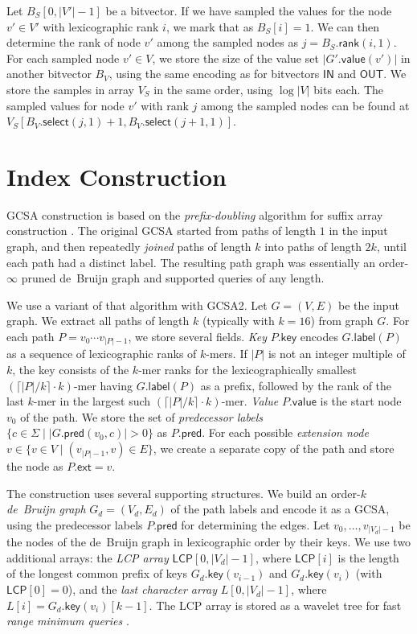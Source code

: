 \documentclass[twoside,leqno,twocolumn]{article}
\newcommand{\set}[1]{\ensuremath{\{ #1 \}}}
\newcommand{\abs}[1]{\ensuremath{\lvert #1 \rvert}}
\newcommand{\rank}{\ensuremath{\mathsf{rank}}}
\newcommand{\select}{\ensuremath{\mathsf{select}}}
\newcommand{\glabel}{\ensuremath{\mathsf{label}}}
\newcommand{\gpred}{\ensuremath{\mathsf{pred}}}
\newcommand{\gkey}{\ensuremath{\mathsf{key}}}
\newcommand{\gvalue}{\ensuremath{\mathsf{value}}}
\newcommand{\gext}{\ensuremath{\mathsf{ext}}}
\newcommand{\kmer}[1]{$#1$\nobreakdash-mer}
\newcommand{\orderk}[1]{order\nobreakdash-$#1$}
\newcommand{\LCP}{\ensuremath{\mathsf{LCP}}}
\newcommand{\bvIN}{\ensuremath{\mathsf{IN}}}
\newcommand{\bvOUT}{\ensuremath{\mathsf{OUT}}}
\begin{document}
Let $B_{S}[0, \abs{V'}-1]$ be a bitvector. If we have sampled the values for the node $v' \in V'$ with lexicographic rank $i$, we mark that as $B_{S}[i] = 1$. We can then determine the rank of node $v'$ among the sampled nodes as $j = B_{S}.\rank(i, 1)$. For each sampled node $v' \in V$, we store the size of the value set $\abs{G'.\gvalue(v')}$ in another bitvector $B_{V}$, using the same encoding as for bitvectors $\bvIN$ and $\bvOUT$. We store the samples in array $V_{S}$ in the same order, using $\log \abs{V}$ bits each. The sampled values for node $v'$ with rank $j$ among the sampled nodes can be found at $V_{S}[B_{V}.\select(j, 1) + 1, B_{V}.\select(j+1, 1)]$.


\section{Index Construction}\label{appendix:construction}

GCSA construction \cite{Siren2014} is based on the \emph{prefix-doubling} algorithm for suffix array construction \cite{Manber1993}. The original GCSA started from paths of length $1$ in the input graph, and then repeatedly \emph{joined} paths of length $k$ into paths of length $2k$, until each path had a distinct label. The resulting path graph was essentially an \orderk{\infty} pruned de~Bruijn graph and supported queries of any length.

We use a variant of that algorithm with GCSA2. Let $G = (V, E)$ be the input graph. We extract all paths of length $k$ (typically with $k = 16$) from graph $G$. For each path $P = v_{0} \dotsm v_{\abs{P}-1}$, we store several fields. \emph{Key} $P.\gkey$ encodes $G.\glabel(P)$ as a sequence of lexicographic ranks of \kmer{k}s. If $\abs{P}$ is not an integer multiple of $k$, the key consists of the \kmer{k} ranks for the lexicographically smallest \kmer{(\lceil \abs{P}/k \rceil \cdot k)} having $G.\glabel(P)$ as a prefix, followed by the rank of the last \kmer{k} in the largest such \kmer{(\lceil \abs{P}/k \rceil \cdot k)}. \emph{Value} $P.\gvalue$ is the start node $v_{0}$ of the path. We store the set of \emph{predecessor labels} $\set{c \in \Sigma \mid \abs{G.\gpred(v_{0}, c)} > 0}$ as $P.\gpred$. For each possible \emph{extension node} $v \in \set{v \in V \mid (v_{\abs{P}-1}, v) \in E}$, we create a separate copy of the path and store the node as $P.\gext = v$.

The construction uses several supporting structures. We build an \orderk{k} \emph{de~Bruijn graph} $G_{d} = (V_{d}, E_{d})$ of the path labels and encode it as a GCSA, using the predecessor labels $P.\gpred$ for determining the edges. Let $v_{0}, \dotsc, v_{\abs{V_{d}}-1}$ be the nodes of the de~Bruijn graph in lexicographic order by their keys. We use two additional arrays: the \emph{LCP array} $\LCP[0, \abs{V_{d}}-1]$, where $\LCP[i]$ is the length of the longest common prefix of keys $G_{d}.\gkey(v_{i-1})$ and $G_{d}.\gkey(v_{i})$ (with $\LCP[0] = 0$), and the \emph{last character array} $L[0, \abs{V_{d}}-1]$, where $L[i] = G_{d}.\gkey(v_{i})[k-1]$. The LCP array is stored as a wavelet tree for fast \emph{range minimum queries} \cite{Gagie2012a}.
\end{document}
